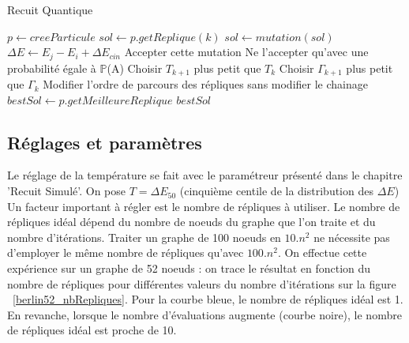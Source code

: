 \documentclass{article}%
\begin{document}
	\begin{algorithm}[!h] 
	\caption{Recuit Quantique}
	\begin{algorithmic}
	
	\STATE $p \leftarrow creeParticule$
			\STATE $sol \leftarrow p.getReplique(k) $
			\STATE $sol \leftarrow mutation( sol ) $
			\STATE $\Delta{E} \leftarrow E_j-E_i+\Delta{E_{cin}}$
				\STATE Accepter cette mutation	
			\ELSE 
				\STATE Ne l'accepter qu'avec une probabilité égale à $\mathbb{P}$(A)
			\ENDIF
			\STATE Choisir $T_{k+1}$ plus petit que $T_{k}$
			\STATE Choisir $\Gamma_{k+1}$ plus petit que $\Gamma_{k}$
			\STATE Modifier l'ordre de parcours des répliques sans modifier le chainage
		\ENDFOR
	\ENDFOR
	\STATE $ bestSol \leftarrow p.getMeilleureReplique $
	\RETURN $ bestSol $
	
	\end{algorithmic}
	\end{algorithm}
		
		\vspace{1cm}

\subsection{Réglages et paramètres}

\vspace{1cm}

	Le réglage de la température se fait avec le paramétreur présenté dans le chapitre 'Recuit Simulé'. On pose $ T = \Delta E_{50} $ (cinquième centile de la distribution des $ \Delta E $)
	Un facteur important à régler est le nombre de répliques à utiliser. Le nombre de répliques idéal dépend du nombre de noeuds du graphe que l'on traite et du nombre d'itérations. Traiter un graphe de 100 noeuds en $ 10.n^2 $ ne nécessite pas d'employer le même nombre de répliques qu'avec $ 100.n^2 $. On effectue cette expérience sur un graphe de 52 noeuds : on trace le résultat en fonction du nombre de répliques pour différentes valeurs du nombre d'itérations sur la figure ~\ref{berlin52_nbRepliques}. Pour la courbe bleue, le nombre de répliques idéal est 1. En revanche, lorsque le nombre d'évaluations augmente (courbe noire), le nombre de répliques idéal est proche de 10.
	
\end{document}
